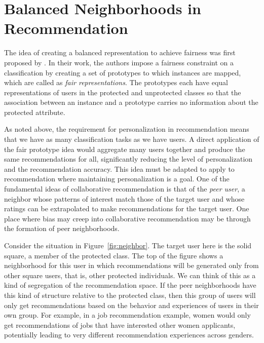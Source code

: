 

\section{Balanced Neighborhoods in Recommendation}

The idea of creating a balanced representation to achieve fairness was first proposed by \cite{zemel2013learning}. In their work, the authors impose a fairness constraint on a classification by creating a set of prototypes to which instances are mapped, which are called as \textit{fair representations}. The prototypes each have equal representations of users in the protected and unprotected classes so that the association between an instance and a prototype carries no information about the protected attribute. 

As noted above, the requirement for personalization in recommendation means that we have as many classification tasks as we have users. A direct application of the fair prototype idea would aggregate many users together and produce the same recommendations for all, significantly reducing the level of personalization and the recommendation accuracy. This idea must be adapted to apply to recommendation where maintaining personalization is a goal. One of the fundamental ideas of collaborative recommendation is that of the \textit{peer user}, a neighbor whose patterns of interest match those of the target user and whose ratings can be extrapolated to make recommendations for the target user. One place where bias may creep into collaborative recommendation may be through the formation of peer neighborhoods.

Consider the situation in Figure~\ref{fig:neighbor}. The target user here is the solid square, a member of the protected class. The top of the figure shows a neighborhood for this user in which recommendations will be generated only from other square users, that is, other protected individuals. We can think of this as a kind of segregation of the recommendation space. If the peer neighborhoods have this kind of structure relative to the protected class, then this group of users will only get recommendations based on the behavior and experiences of users in their own group. For example, in a job recommendation example, women would only get recommendations of jobs that have interested other women applicants, potentially leading to very different recommendation experiences across genders. 

